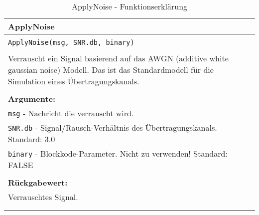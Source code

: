 \begin{longtable}{|p{\textwidth}|}
\hline
\rowcolor{lightblue}
ApplyNoise\\
\hline
\\
\texttt{ApplyNoise(msg, SNR.db, binary)}\\
\\
Verrauscht ein Signal basierend auf das AWGN (additive white gaussian noise) Modell. Das ist das Standardmodell für die Simulation eines Übertragungskanals.\\
\\
\textbf{Argumente:}\\
\texttt{msg} - Nachricht die verrauscht wird.\\
\texttt{SNR.db} - Signal/Rausch-Verhältnis des Übertragungskanals. Standard: 3.0\\
\texttt{binary} - Blockkode-Parameter. Nicht zu verwenden! Standard: FALSE\\
\\
\textbf{Rückgabewert:}\\
Verrauschtes Signal.\\
\\
\hline
\caption[ApplyNoise]{ApplyNoise - Funktionserklärung}
\end{longtable}